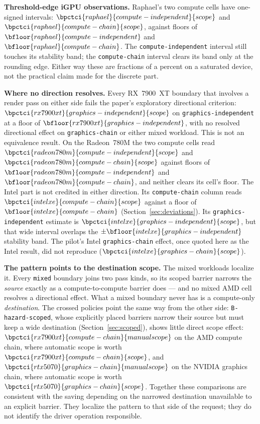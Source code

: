 \documentclass[10pt,twocolumn]{article}
\begin{document}
\textbf{Threshold-edge iGPU observations.} Raphael's two compute cells have
one-signed intervals:
$\bpctci{raphael}{compute-independent}{scope}$ and
$\bpctci{raphael}{compute-chain}{scope}$, against floors of
$\bfloor{raphael}{compute-independent}$ and
$\bfloor{raphael}{compute-chain}$. The
\texttt{compute-independent} interval still touches its stability band; the
\texttt{compute-chain} interval clears its band only at the rounding edge.
Either way these are fractions of a percent on a saturated device, not the
practical claim made for the discrete part.

\textbf{Where no direction resolves.} Every RX~7900~XT boundary that involves
a render pass on either side fails the paper's exploratory directional
criterion: $\bpctci{rx7900xt}{graphics-independent}{scope}$ on
\texttt{graphics-independent} at a floor of
$\bfloor{rx7900xt}{graphics-independent}$, with no resolved directional effect
on \texttt{graphics-chain} or either mixed workload. This is not an
equivalence result. On the Radeon~780M the two compute cells read
$\bpctci{radeon780m}{compute-independent}{scope}$ and
$\bpctci{radeon780m}{compute-chain}{scope}$ against floors of
$\bfloor{radeon780m}{compute-independent}$ and
$\bfloor{radeon780m}{compute-chain}$, and neither clears its cell's floor.
The Intel part is not credited in either direction. Its
\texttt{compute-chain} column reads
$\bpctci{intelxe}{compute-chain}{scope}$ against a floor of
$\bfloor{intelxe}{compute-chain}$
(Section~\ref{sec:deviations}). Its
\texttt{graphics-independent} estimate is
$\bpctci{intelxe}{graphics-independent}{scope}$, but that wide interval
overlaps the $\pm\bfloor{intelxe}{graphics-independent}$ stability band.
The pilot's Intel \texttt{graphics-chain} effect, once quoted here as the Intel
result, did not reproduce
($\bpctci{intelxe}{graphics-chain}{scope}$).

\textbf{The pattern points to the destination scope.} The mixed workloads
localize it.
Every \texttt{mixed} boundary joins two pass kinds, so its scoped barrier
narrows the \emph{source} exactly as a compute-to-compute barrier does ---
and no mixed AMD cell resolves a directional effect. What a mixed boundary
never has is a compute-only \emph{destination}. The crossed policies point the
same way from the other side: \texttt{B-hazard-scoped}, whose explicitly
placed barriers narrow their source but must keep a wide destination
(Section~\ref{sec:scoped}), shows little direct scope effect:
$\bpctci{rx7900xt}{compute-chain}{manualscope}$ on the AMD compute chain,
where automatic scope is worth
$\bpctci{rx7900xt}{compute-chain}{scope}$, and
$\bpctci{rtx5070}{graphics-chain}{manualscope}$ on the NVIDIA graphics chain,
where automatic scope is worth
$\bpctci{rtx5070}{graphics-chain}{scope}$. Together these comparisons are
consistent with the saving depending on the narrowed destination unavailable
to an explicit barrier. They localize the pattern to that side of the request;
they do not identify the driver operation responsible.
\end{document}
